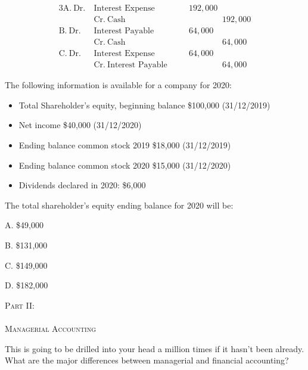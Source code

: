\documentclass{scrartcl}
\begin{document}
\begin{alignat*}{3}
    \text{A.} ~ \text{Dr.} ~ & \text{Interest Expense} & \quad & 192,000 \\
                  & \text{Cr.} ~ \text{Cash} && \hspace{4em} 192,000 \\
    \text{B.} ~ \text{Dr.} ~ & \text{Interest Payable} & \quad & 64,000 \\
                  & \text{Cr.} ~ \text{Cash} && \hspace{4em} 64,000 \\
    \text{C.} ~ \text{Dr.} ~ & \text{Interest Expense} & \quad & 64,000 \\
                  & \text{Cr.} ~ \text{Interest Payable} && \hspace{4em} 64,000 
\end{alignat*}

\vspace{10em}

The following information is available for a company for 2020:
\begin{itemize}
    \item Total Shareholder's equity, beginning balance \$100,000 (31/12/2019)
    \item Net income \$40,000 (31/12/2020)
    \item Ending balance common stock 2019 \$18,000 (31/12/2019)
    \item Ending balance common stock 2020 \$15,000 (31/12/2020)
    \item Dividends declared in 2020: \$6,000
\end{itemize}

The total shareholder's equity ending balance for 2020 will be:

\bigskip

A. \$\phantom{0}49,000

B. \$131,000

C. \$149,000

D. \$182,000


\newpage

\thispagestyle{empty}

\clearpage
\vspace*{\fill}
\begin{center}
\begin{minipage}{\textwidth}
    \begin{center}
        {\Huge \scshape Part II: \\ \phantom{.} \\ Managerial Accounting}
    \end{center}
\end{minipage}
\end{center}
\vfill 
\clearpage
\vspace{10em}

\newpage

This is going to be drilled into your head a million times if it hasn't
been already. What are the major differences between managerial and
financial accounting?

\vspace{10em}
\end{document}
